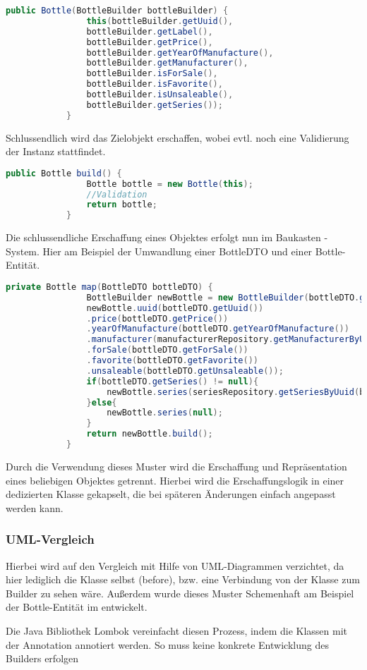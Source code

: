 		\begin{lstlisting}[language=java,caption={Beispiel einer Builder Methode},gobble=11]
			public Bottle(BottleBuilder bottleBuilder) {
				this(bottleBuilder.getUuid(),
				bottleBuilder.getLabel(), 
				bottleBuilder.getPrice(), 
				bottleBuilder.getYearOfManufacture(), 
				bottleBuilder.getManufacturer(), 
				bottleBuilder.isForSale(), 
				bottleBuilder.isFavorite(), 
				bottleBuilder.isUnsaleable(),
				bottleBuilder.getSeries());
			}
		\end{lstlisting}
		Schlussendlich wird das Zielobjekt erschaffen, wobei evtl. noch eine Validierung der Instanz stattfindet.
		\begin{lstlisting}[language=java,caption={Beispiel einer build() Methode eines Builders},gobble=11]
			public Bottle build() {
				Bottle bottle = new Bottle(this);
				//Validation
				return bottle;
			}
		\end{lstlisting}
		Die schlussendliche Erschaffung eines Objektes erfolgt nun im Baukasten - System. Hier am Beispiel der Umwandlung einer BottleDTO und einer Bottle-Entität.
		\begin{lstlisting}[language=java,caption={Beispiel eines build() Aufrufs einer Methode eines Builders},gobble=11,basicstyle=\tiny]
			private Bottle map(BottleDTO bottleDTO) {
				BottleBuilder newBottle = new BottleBuilder(bottleDTO.getLabel());
				newBottle.uuid(bottleDTO.getUuid())
				.price(bottleDTO.getPrice())
				.yearOfManufacture(bottleDTO.getYearOfManufacture())
				.manufacturer(manufacturerRepository.getManufacturerByUuid(bottleDTO.getManufacturer().getUuid()))
				.forSale(bottleDTO.getForSale())
				.favorite(bottleDTO.getFavorite())
				.unsaleable(bottleDTO.getUnsaleable());
				if(bottleDTO.getSeries() != null){
					newBottle.series(seriesRepository.getSeriesByUuid(bottleDTO.getSeries().getUuid()));
				}else{
					newBottle.series(null);
				}
				return newBottle.build();
			}
		\end{lstlisting}
		Durch die Verwendung dieses Muster wird die Erschaffung und Repräsentation eines beliebigen Objektes getrennt. Hierbei wird die Erschaffungslogik in einer dedizierten Klasse gekapselt, die bei späteren Änderungen einfach angepasst werden kann.
		
		\subsubsection{UML-Vergleich}
		Hierbei wird auf den Vergleich mit Hilfe von \ac{UML}-Diagrammen verzichtet, da hier lediglich die Klasse selbst (before), bzw. eine Verbindung von der Klasse zum Builder zu sehen wäre. Außerdem wurde dieses Muster Schemenhaft am Beispiel der Bottle-Entität im  entwickelt. 
		\par Die Java Bibliothek Lombok vereinfacht diesen Prozess, indem die Klassen mit der Annotation  annotiert werden. So muss keine konkrete Entwicklung des Builders erfolgen